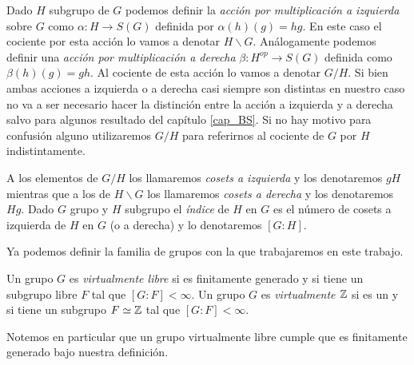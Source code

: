 \documentclass[tesis.tex]{subfiles}
\begin{document}
	
Dado $H$ subgrupo de $G$ podemos definir la \emph{acción por multiplicación a izquierda} sobre $G$ como $\alpha: H \to S(G)$ definida por $\alpha(h)(g) = hg$.
En este caso el cociente por esta acción lo vamos a denotar $H \backslash G $.
Análogamente podemos definir una \emph{acción por multiplicación a derecha} $\beta:H^{op} \to S(G)$ definida como $\beta(h)(g) = gh$.
Al cociente de esta acción lo vamos a denotar $G/H$.
Si bien ambas acciones a izquierda o a derecha casi siempre son distintas en nuestro caso no va a ser necesario hacer la distinción entre la acción a izquierda y a derecha salvo para algunos resultado del capítulo \ref{cap_BS}.
Si no hay motivo para confusión alguno utilizaremos $G/H$ para referirnos al cociente de $G$ por $H$ indistintamente.






A los elementos de $G/H$ los llamaremos \emph{cosets a izquierda} y los denotaremos $gH$ mientras que a los de $H \backslash G$ los llamaremos \emph{cosets a derecha} y los denotaremos $Hg$.
Dado $G$ grupo y $H$ subgrupo el \emph{índice} de $H$ en $G$ es el número de cosets a izquierda de $H$ en $G$ (o a derecha) y lo denotaremos $[G:H]$.


Ya podemos definir la familia de grupos con la que trabajaremos en este trabajo.

\begin{deff}
	Un grupo $G$ es \emph{virtualmente libre} si es finitamente generado y si
	tiene un subgrupo libre $F$ tal que $[G:F] < \infty$.
	Un grupo $G$ es \emph{virtualmente $\mathbb{Z}$} si es un \fg y si tiene un subgrupo $F \simeq \mathbb{Z}$ tal que $[G:F] < \infty$. 
\end{deff}

Notemos en particular que un grupo virtualmente libre cumple que es finitamente generado bajo nuestra definición.
\end{document}
